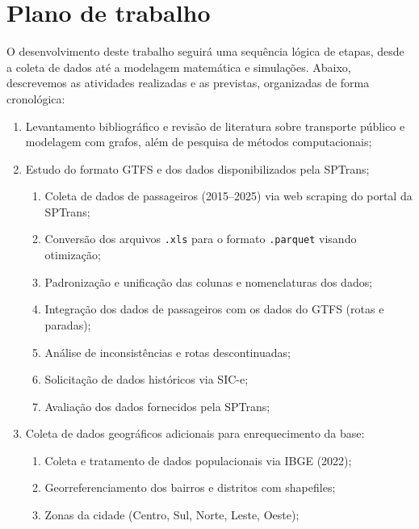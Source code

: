 \chapter{Plano de trabalho}

O desenvolvimento deste trabalho seguirá uma sequência lógica de etapas, desde a coleta de dados até a modelagem matemática e simulações. Abaixo, descrevemos as atividades realizadas e as previstas, organizadas de forma cronológica:

\begin{enumerate}
    \item Levantamento bibliográfico e revisão de literatura sobre transporte público e modelagem com grafos, além de pesquisa de métodos computacionais;
    \item Estudo do formato GTFS e dos dados disponibilizados pela SPTrans;
    \begin{enumerate}
    \item Coleta de dados de passageiros (2015–2025) via web scraping do portal da SPTrans;
    \item Conversão dos arquivos \texttt{.xls} para o formato \texttt{.parquet} visando otimização;
    \item Padronização e unificação das colunas e nomenclaturas dos dados;
    \item Integração dos dados de passageiros com os dados do GTFS (rotas e paradas);
    \item Análise de inconsistências e rotas descontinuadas;
    \item Solicitação de dados históricos via SIC-e;
    \item Avaliação dos dados fornecidos pela SPTrans;
    \end{enumerate}
    \item Coleta de dados geográficos adicionais para enrequecimento da base:
    \begin{enumerate}
    \item Coleta e tratamento de dados populacionais via IBGE (2022);
    \item Georreferenciamento dos bairros e distritos com shapefiles;
    \item Zonas da cidade (Centro, Sul, Norte, Leste, Oeste);
     \end{enumerate}
     

\end{enumerate}
